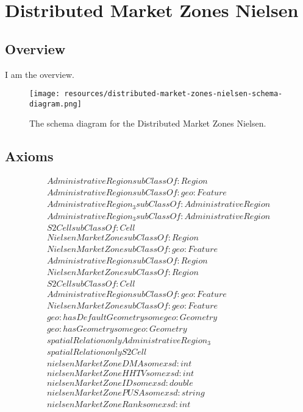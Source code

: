 
\section{Distributed Market Zones Nielsen}
\label{sec:distributed-market-zones-nielsen}
\subsection{Overview}
\label{ssec:overview}

I am the overview.

\begin{figure}[h!]
  \begin{center}
    \texttt{[image: resources/distributed-market-zones-nielsen-schema-diagram.png]}
  \end{center}
  \caption{The schema diagram for the Distributed Market Zones Nielsen.}
  \label{fig:ov-diagram}
\end{figure}


\subsection{Axioms}
\begin{align}
  AdministrativeRegion subClassOf: Region\\
  AdministrativeRegion subClassOf: geo:Feature\\
  AdministrativeRegion_3 subClassOf: AdministrativeRegion\\
  AdministrativeRegion_3 subClassOf: AdministrativeRegion\\
  S2Cell subClassOf: Cell\\
  NielsenMarketZone subClassOf: Region\\
  NielsenMarketZone subClassOf: geo:Feature\\
  AdministrativeRegion subClassOf: Region\\
  NielsenMarketZone subClassOf: Region\\
  S2Cell subClassOf: Cell\\
  AdministrativeRegion subClassOf: geo:Feature\\
  NielsenMarketZone subClassOf: geo:Feature\\
  geo:hasDefaultGeometry some geo:Geometry \\
  geo:hasGeometry some geo:Geometry \\
  spatialRelation only AdministrativeRegion_3 \\
  spatialRelation only S2Cell \\
  nielsenMarketZoneDMA some xsd:int \\
  nielsenMarketZoneHHTV some xsd:int \\
  nielsenMarketZoneID some xsd:double \\
  nielsenMarketZonePUSA some xsd:string \\
  nielsenMarketZoneRank some xsd:int \end{align}


